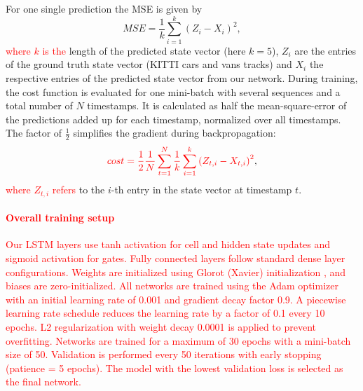 \documentclass[letterpaper, 10 pt, journal, twoside]{IEEEtran}
\newcommand{\red}[1]{\textcolor{red}{#1}}
\begin{document}
For one single prediction the \ac{MSE} is given by
\begin{equation}
	MSE = \frac{1}{k}\sum_{i=1}^{k}{({Z}_i-{{X}}_i)}^2,
\end{equation}
\noindent
\red{where $k$ is the} length of the predicted state vector (here $k=5$), $Z_i$ are the entries of the ground truth state vector (KITTI cars and vans tracks) and ${X}_i$ the respective entries of the predicted state vector from our network.
During training, the cost function is evaluated for one mini-batch with several sequences and a total number of $N$ timestamps.
It is calculated as half the mean-square-error of the predictions added up for each timestamp, normalized over all timestamps.
The factor of $\frac{1}{2}$ simplifies the gradient during backpropagation:
\begin{equation}
	\red{cost = \frac{1}{2}\frac{1}{N} \sum_{t=1}^{N}\frac{1}{k}\sum_{i=1}^{k}{({Z_{t,i}}-{{X}_{t,i}})}^2},
\end{equation}
\noindent
\red{where $Z_{t,i}$ refers} to the $i$-th entry in the state vector at timestamp $t$.

\paragraph{\red{Overall training setup}}
\red{Our \ac{LSTM} layers use tanh activation for cell and hidden state updates and sigmoid activation for gates. Fully connected layers follow standard dense layer configurations. Weights are initialized using Glorot (Xavier) initialization {\cite{DL_FC.2010}}, and biases are zero-initialized.
All networks are trained using the Adam optimizer with an initial learning rate of 0.001 and gradient decay factor 0.9.
A piecewise learning rate schedule reduces the learning rate by a factor of 0.1 every 10 epochs.
L2 regularization with weight decay 0.0001 is applied to prevent overfitting.
Networks are trained for a maximum of 30 epochs with a mini-batch size of 50.
Validation is performed every 50 iterations with early stopping (patience = 5 epochs).
The model with the lowest validation loss is selected as the final network.}
\end{document}
